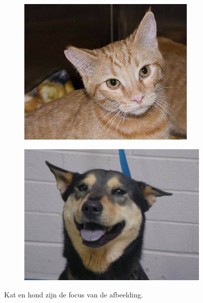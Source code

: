 \begin{figure}
    \begin{subfigure}{.5\textwidth}
        \centering
        \includegraphics[width=.8\linewidth]{img/good_cat.jpg}
        \label{fig:cat-goog}
    \end{subfigure}%
    \begin{subfigure}{.5\textwidth}
        \centering
        \includegraphics[width=.8\linewidth]{img/good_dog.jpg}
        \label{fig:dog-good}
    \end{subfigure}
    \caption{Kat en hond zijn de focus van de afbeelding.}
    \label{fig:catdog-good}
\end{figure}

